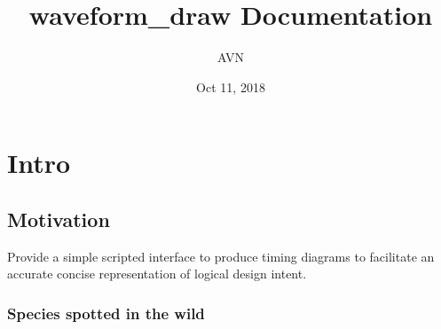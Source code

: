 \documentclass[letterpaper,10pt,english]{sphinxmanual}
\title{waveform\_draw Documentation}
\date{Oct 11, 2018}
\author{AVN}
\begin{document}
\maketitle
\sphinxtableofcontents
{}\label{\detokenize{index::doc}}



\chapter{Intro}
\label{\detokenize{intro::doc}}\label{\detokenize{intro:id1}}\label{\detokenize{intro:welcome-to-waveform-draw-s-documentation}}\label{\detokenize{intro:intro}}

\section{Motivation}
\label{\detokenize{intro:motivation}}
Provide a simple scripted interface to produce timing diagrams to facilitate an
accurate concise representation of logical design intent.


\subsection{Species spotted in the wild}
\label{\detokenize{intro:species-spotted-in-the-wild}}
\end{document}
